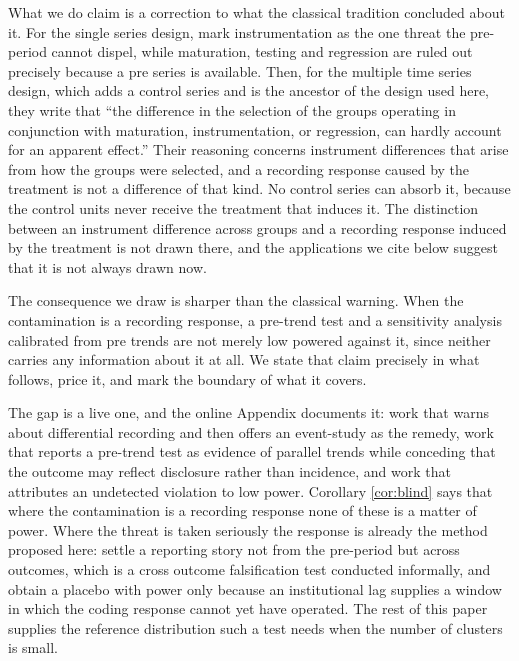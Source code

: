 \documentclass[12pt]{article}
\theoremstyle{definition}
\numberwithin{equation}{section}
\begin{document}
What we do claim is a correction to what the classical tradition concluded about
it. For the single series design, \citet{campbell1963experimental} mark
instrumentation as the one threat the pre-period cannot dispel, while maturation,
testing and regression are ruled out precisely because a pre series is available.
Then, for the multiple time series design, which adds a control series and is the
ancestor of the design used here, they write that ``the difference in the
selection of the groups operating in conjunction with maturation, instrumentation,
or regression, can hardly account for an apparent effect.'' Their reasoning concerns
instrument differences that arise from how the groups were selected, and a
recording response caused by the treatment is not a difference of that kind. No
control series can absorb it, because the control units never receive the
treatment that induces it. The distinction between an instrument difference
across groups and a recording response induced by the treatment is not drawn
there, and the applications we cite below suggest that it is not always drawn
now.

The consequence we draw is sharper than the classical warning. When the
contamination is a recording response, a pre-trend test and a sensitivity
analysis calibrated from pre trends are not merely low powered against it, since
neither carries any information about it at all. We state that claim precisely
in what follows, price it, and mark the boundary of what it covers.

The gap is a live one, and the online Appendix documents it: work that warns about differential recording and then offers an event-study as the remedy, work that reports a pre-trend test as evidence of parallel trends while conceding that the outcome may reflect disclosure rather than incidence, and work that attributes an undetected violation to low power. Corollary \ref{cor:blind} says that where the contamination is a recording response none of these is a matter of power. Where the threat is taken seriously the response is already the method proposed here: \citet{harasztosi2019minwage} settle a reporting story not from the pre-period but across outcomes, which is a cross outcome falsification test conducted informally, and \citet{geruso2020upcoding} obtain a placebo with power only because an institutional lag supplies a window in which the coding response cannot yet have operated. The rest of this paper supplies the reference distribution such a test needs when the number of clusters is small.
\end{document}
